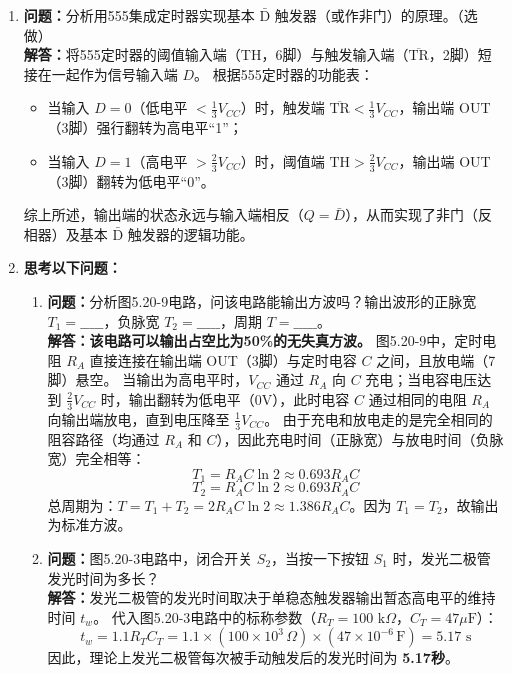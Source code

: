 ﻿\documentclass[10.5pt]{config}
\begin{document}
\begin{enumerate}[label=\arabic*., leftmargin=2em]
    \item[2.] \textbf{问题：}分析用555集成定时器实现基本 $\bar{\text{D}}$ 触发器（或作非门）的原理。（选做）
    \\ \textbf{解答：}将555定时器的阈值输入端（TH，6脚）与触发输入端（$\overline{\text{TR}}$，2脚）短接在一起作为信号输入端 $D$。
    根据555定时器的功能表：
    \begin{itemize}
        \item 当输入 $D = 0$（低电平 $< \frac{1}{3}V_{CC}$）时，触发端 $\overline{\text{TR}} < \frac{1}{3}V_{CC}$，输出端 OUT（3脚）强行翻转为高电平“1”；
        \item 当输入 $D = 1$（高电平 $> \frac{2}{3}V_{CC}$）时，阈值端 $\text{TH} > \frac{2}{3}V_{CC}$，输出端 OUT（3脚）翻转为低电平“0”。
    \end{itemize}
    综上所述，输出端的状态永远与输入端相反（$Q = \bar{D}$），从而实现了非门（反相器）及基本 $\bar{\text{D}}$ 触发器的逻辑功能。

    \item[3.] \textbf{思考以下问题：}
    \begin{enumerate}[label=(\arabic*)]
        \item \textbf{问题：}分析图5.20-9电路，问该电路能输出方波吗？输出波形的正脉宽 $T_1 = \_\_\_\_\_$，负脉宽 $T_2 = \_\_\_\_\_$，周期 $T = \_\_\_\_\_$。
        \\ \textbf{解答：}\textbf{该电路可以输出占空比为50\%的无失真方波。}
        图5.20-9中，定时电阻 $R_A$ 直接连接在输出端 OUT（3脚）与定时电容 $C$ 之间，且放电端（7脚）悬空。
        当输出为高电平时，$V_{CC}$ 通过 $R_A$ 向 $C$ 充电；当电容电压达到 $\frac{2}{3}V_{CC}$ 时，输出翻转为低电平（0V），此时电容 $C$ 通过相同的电阻 $R_A$ 向输出端放电，直到电压降至 $\frac{1}{3}V_{CC}$。
        由于充电和放电走的是完全相同的阻容路径（均通过 $R_A$ 和 $C$），因此充电时间（正脉宽）与放电时间（负脉宽）完全相等：
        $$T_1 = R_A C \ln 2 \approx 0.693 R_A C$$
        $$T_2 = R_A C \ln 2 \approx 0.693 R_A C$$
        总周期为：$T = T_1 + T_2 = 2 R_A C \ln 2 \approx 1.386 R_A C$。因为 $T_1 = T_2$，故输出为标准方波。

        \item \textbf{问题：}图5.20-3电路中，闭合开关 $S_2$，当按一下按钮 $S_1$ 时，发光二极管发光时间为多长？
        \\ \textbf{解答：}发光二极管的发光时间取决于单稳态触发器输出暂态高电平的维持时间 $t_w$。
        代入图5.20-3电路中的标称参数（$R_T = 100\text{ k}\Omega$，$C_T = 47\mu\text{F}$）：
        $$t_w = 1.1 R_T C_T = 1.1 \times (100 \times 10^3\,\Omega) \times (47 \times 10^{-6}\,\text{F}) = 5.17\text{ s}$$
        因此，理论上发光二极管每次被手动触发后的发光时间为 \textbf{5.17秒}。


\end{enumerate}
\end{enumerate}
\end{document}
